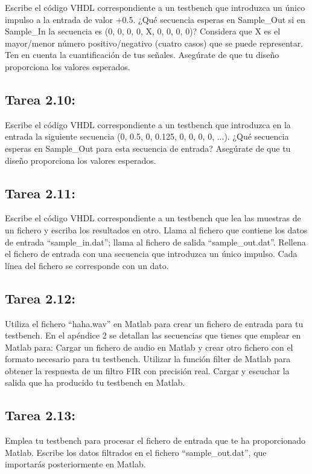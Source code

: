 \documentclass{article}
\begin{document}
Escribe el código VHDL correspondiente a un testbench que introduzca un único impulso a la entrada de valor +0.5. ¿Qué secuencia esperas en Sample{\_}Out si en Sample{\_}In la secuencia es (0, 0, 0, 0, X, 0, 0, 0, 0)? Considera que X es el mayor/menor número positivo/negativo (cuatro casos) que se puede representar. Ten en cuenta la cuantificación
de tus señales. Asegúrate de que tu diseño proporciona los valores esperados.

\subsection{Tarea 2.10:}

Escribe el código VHDL correspondiente a un testbench que introduzca en la entrada
la siguiente secuencia (0, 0.5, 0, 0.125, 0, 0, 0, 0, ...). ¿Qué secuencia esperas en Sample{\_}Out para esta secuencia de entrada? Asegúrate de que tu diseño proporciona los valores esperados.

\subsection{Tarea 2.11:}
Escribe el código VHDL correspondiente a un testbench que lea las muestras de un fichero y escriba los resultados en otro.
Llama al fichero que contiene los datos de entrada “sample{\_}in.dat”; llama al fichero de salida “sample{\_}out.dat”.
Rellena el fichero de entrada con una secuencia que introduzca un único impulso.
Cada línea del fichero se corresponde con un dato.

\subsection{Tarea 2.12:}

Utiliza el fichero “haha.wav” en Matlab para crear un fichero de entrada para tu testbench. En el apéndice 2 se detallan las secuencias que tienes que emplear en Matlab para:
Cargar un fichero de audio en Matlab y crear otro fichero con el formato necesario para tu testbench.
Utilizar la función filter de Matlab para obtener la respuesta de un filtro FIR con precisión real.
Cargar y escuchar la salida que ha producido tu testbench en Matlab.

\subsection{Tarea 2.13:}
Emplea tu testbench para procesar el fichero de entrada que te ha proporcionado
Matlab. Escribe los datos filtrados en el fichero “sample{\_}out.dat”, que importarás posteriormente en Matlab.
\end{document}
